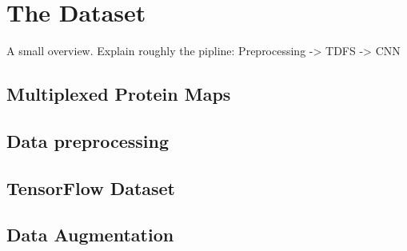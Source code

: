 \chapter{The Dataset}
\label{ch:dataset}

A small overview. Explain roughly the pipline: Preprocessing -> TDFS -> CNN

\section{Multiplexed Protein Maps}
\label{sec:dataset:multiplexed_protein_maps}


\section{Data preprocessing}
\label{sec:dataset:data_pp}


\section{TensorFlow Dataset}
\label{sec:dataset:tfds}

\section{Data Augmentation}
\label{sec:dataset:data_augmentation}

